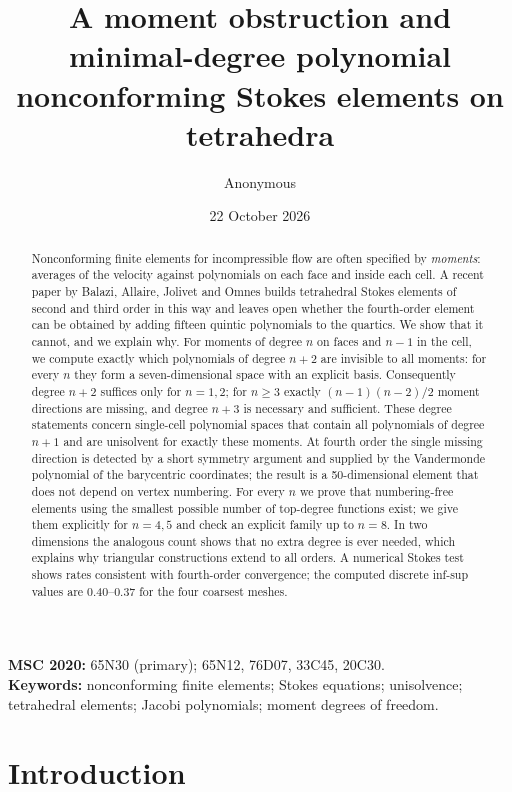 \documentclass[11pt,a4paper]{article}
\title{A moment obstruction and minimal-degree polynomial\\
nonconforming Stokes elements on tetrahedra}
\author{Anonymous}
\date{22 October 2026}
\theoremstyle{definition}
\theoremstyle{remark}
\begin{document}
\maketitle

\begin{abstract}
Nonconforming finite elements for incompressible flow are often
specified by \emph{moments}: averages of the velocity against
polynomials on each face and inside each cell. A recent paper by
Balazi, Allaire, Jolivet and Omnes builds tetrahedral Stokes elements
of second and third order in this way and leaves open whether the
fourth-order element can be obtained by adding fifteen quintic
polynomials to the quartics. We show that it cannot, and we explain
why. For moments of degree \(n\) on faces and \(n-1\) in the cell, we
compute exactly which polynomials of degree \(n+2\) are invisible to
all moments: for every \(n\) they form a seven-dimensional space with an
explicit basis. Consequently degree \(n+2\) suffices only for \(n=1,2\);
for \(n\ge3\) exactly \((n-1)(n-2)/2\) moment directions are missing,
and degree \(n+3\) is necessary and sufficient. These degree statements
concern single-cell polynomial spaces that contain all polynomials of
degree \(n+1\) and are unisolvent for exactly these moments. At fourth
order the single missing direction is detected by a short symmetry
argument and supplied by the Vandermonde polynomial of the barycentric
coordinates; the result is a 50-dimensional element that does not
depend on vertex numbering. For every \(n\) we prove that numbering-free
elements using the smallest possible number of top-degree functions exist;
we give them explicitly for \(n=4,5\) and check an explicit family up to \(n=8\).
In two dimensions the analogous count shows that no extra degree is ever
needed, which explains why triangular constructions extend to all
orders. A numerical Stokes test shows rates consistent with fourth-order
convergence; the computed discrete inf-sup values are 0.40--0.37 for the
four coarsest meshes.
\end{abstract}

\noindent\textbf{MSC 2020:} 65N30 (primary); 65N12, 76D07, 33C45, 20C30.\\
\noindent\textbf{Keywords:} nonconforming finite elements; Stokes
equations; unisolvence; tetrahedral elements; Jacobi polynomials;
moment degrees of freedom.

\section{Introduction}
\label{sec:intro}
\end{document}
